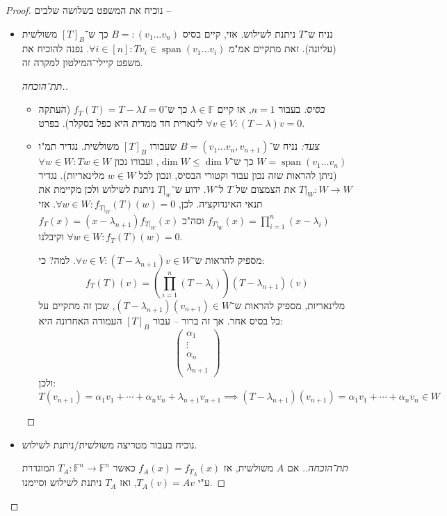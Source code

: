 \documentclass[a4paper]{article}
\DeclareMathOperator{\Sp}      {span}
\newcommand\F         {\mathbb{F}}
\newcommand\co        {\colon}
\newcommand\pms[1]    {\begin{pmatrix}
		#1
\end{pmatrix}}
\newcommand\ag        {\alpha}
\renewcommand\lg      {\lambda}
\newcommand\cl [1]    {\left ( #1 \right )}
\theoremstyle{definition}
\begin{document}
	\begin{proof}
		נוכיח את המשפט בשלושה שלבים – 
		\begin{itemize}
			\item נניח ש־$T$ ניתנת לשילוש. אזי, קיים בסיס $B =: (v_1 \dots v_n)$ כך ש־$[T]_B$ משולשית (עליונה). זאת מתקיים אמ"מ $\forall i \in [n] \co Tv_i \in \Sp(v_1 \dots v_i)$. נפנה להוכיח את משפט קיילי־המילטון למקרה זה. 
			
			\begin{proof}[תת־הוכחה.]\,
				\begin{itemize}
					\item \textit{בסיס:} בעבור $n = 1$, אז קיים $\lg \in \F$ כך ש־$f_T(T) = T - \lg I = 0$ (העתקה לינארית חד ממדית היא כפל בסקלר). בפרט $\forall v \in V \co (T - \lg)v = 0$. 
					\item \textit{צעד:} נניח ש־$B = (v_1 \dots v_n, v_{n + 1})$ שעבורו $[T]_B$ משולשית. נגדיר תמ"ו $W = \Sp(v_1 \dots v_n)$ כך ש־$\dim W \le \dim V$, ועבורו נכון $\forall w \in W \co Tw \in W$ (ניתן להראות שזה נכון עבור וקטורי הבסיס, ונכון לכל $w \in W$ מלינאריות). נגדיר $T|_W \co W \to W$ את הצמצום של $T$ ל־$W$. ידוע ש־$T|_w$ ניתנת לשילוש ולכן מקיימת את תנאי האינדוקציה. לכן, $\forall w \in W\co f_{T|_W}(T)(w) = 0$. אזי $f_{T|_W}(x) = \prod_{i = 1}^{n}(x - \lg_i)$ וסה"כ $f_{T}(x) = (x - \lg_{n + 1})f_{T|_W}(x)$ וקיבלנו $\forall w \in W \co f_T(T)(w) = 0$. 
					
					מספיק להראות ש־$\forall v \in V \co (T - \lg_{n + 1})v \in W$. למה? כי: 
					\[ f_T(T)(v) = \cl{\prod_{i = 1}^{n}(T - \lg_i)}(T - \lg_{n + 1})(v) \]
					מלינאריות, מספיק להראות ש־$(T - \lg_{n + 1})(v_{n + 1})\in W$, שכן זה מתקיים על כל בסיס אחר. אך זה ברור – עבור $[T]_B$ העמודה האחרונה היא: 
					\[ \pms{\ag_1 \\ \vdots \\ \ag_n \\ \lg_{n +1}} \]
					ולכן: 
					\[ T(v_{n + 1}) = \ag_1 v_1 + \cdots + \ag_n v_n + \lg_{n + 1} v_{n + 1} \implies (T - \lg_{n + 1})(v_{n + 1}) = \ag_1v_1 + \cdots + \ag_n v_n \in W \]
				\end{itemize}
			\end{proof}
			\item נוכיח בעבור מטריצה משולשית/ניתנת לשילוש. \begin{proof}[תת־הוכחה.]
				אם $A$ משולשית, אז $f_A(x) = f_{T_A}(x)$ כאשר $T_A \co \F^n \to \F^n$ המוגדרת ע"י $T_A(v) = Av$, ואז $T_A$ ניתנת לשילוש וסיימנו. 
				

\end{proof}
\end{itemize}
\end{proof}
\end{document}
